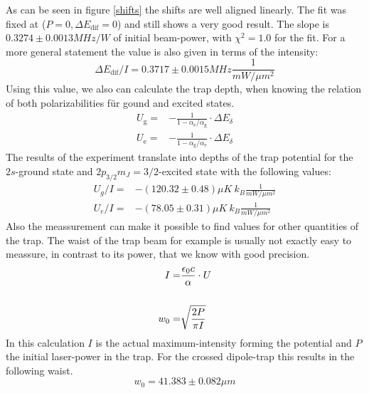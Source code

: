 As can be seen in figure \ref{shifts} the shifts are well aligned linearly. The fit was fixed at ($P=0, \Delta E_\mathrm{dif}=0$) and still shows a very good result. The slope is $0.3274\pm 0.0013\unit{MHz/W}$ of initial beam-power, with $\chi^2=1.0$ for the fit. For a more general statement the value is also given in terms of the intensity:
\begin{equation}
\Delta E_\mathrm{dif}/I=0.3717\pm 0.0015\unit{MHz\frac{1}{mW/\mu m^2}}
\end{equation}
Using this value, we also can calculate the trap depth, when knowing the relation of both polarizabilities für gound and excited states.
\begin{align}
U_{\mathrm{g}}=&-\frac{1}{1-\alpha_{\mathrm{e}}/\alpha_{\mathrm{g}}}\cdot \Delta E_\delta\\
U_{\mathrm{e}}=&-\frac{1}{1-\alpha_{\mathrm{g}}/\alpha_{\mathrm{e}}}\cdot \Delta E_\delta
\end{align}
The results of the experiment translate into depths of the trap potential for the $2s$-ground state and $2p_{3/2} m_J=3/2$-excited state with the following values:
\begin{align}
U_g/I=&-(120.32\pm 0.48)\unit{\mu K\ k_B\frac{1}{mW/\mu m^2}}\\
U_e/I=&-(78.05\pm 0.31)\unit{\mu K\ k_B\frac{1}{mW/\mu m^2}}
\end{align}
Also the meassurement can make it possible to find values for other quantities of the trap. The waist of the trap beam for example is usually not exactly easy to meassure, in contrast to its power, that we know with good precision.
\begin{align}
I=&\frac{\epsilon_0 c}{\alpha}\cdot U\\\notag\\
w_0=&\sqrt{\frac{2P}{\pi I}}
\end{align}
In this calculation $I$ is the actual maximum-intensity forming the potential and $P$ the initial laser-power in the trap. For the crossed dipole-trap this results in the following waist.
\begin{equation}
w_0=41.383\pm 0.082\unit{\mu m}
\end{equation}

